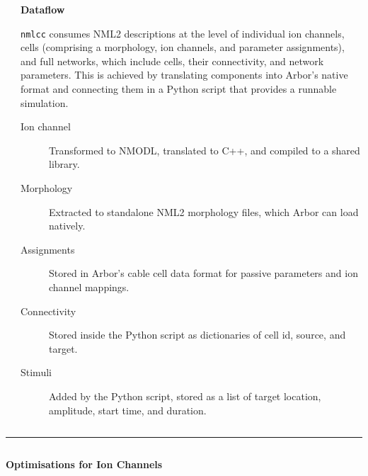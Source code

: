 \documentclass{beamer}
\begin{document}
\begin{frame}[t, fragile]
\begin{columns}
\begin{column}{0.44\textwidth}
    \end{column}
    \begin{column}{0.54\textwidth}
      \textbf{Dataflow}

      \texttt{nmlcc} consumes NML2 descriptions at the level of individual ion
      channels, cells (comprising a morphology, ion channels, and parameter
      assignments), and full networks, which include cells, their connectivity,
      and network parameters. This is achieved by translating components into
      Arbor's native format and connecting them in a Python script that provides
      a runnable simulation.
      \begin{description}
        \item[Ion channel] Transformed to NMODL, translated to C++, and compiled to a
              shared library.
        \item[Morphology] Extracted to standalone NML2 morphology files, which Arbor can
              load natively.
        \item[Assignments] Stored in Arbor's cable cell data format for passive parameters and ion channel mappings.
        \item[Connectivity] Stored inside the Python script as dictionaries of cell id, source, and target.
        \item[Stimuli] Added by the Python script, stored as a list of target location, amplitude, start time, and duration.
      \end{description}
    \end{column}
  \end{columns}
  \vspace*{1ex}
  \textcolor{arbgrey}{\rule{\textwidth}{0.5ex}}
  \vspace*{-1ex}
  \begin{columns}[t]
    \begin{column}{0.49\textwidth}
      \textbf{Optimisations for Ion Channels}


\end{column}
\end{columns}
\end{frame}
\end{document}

